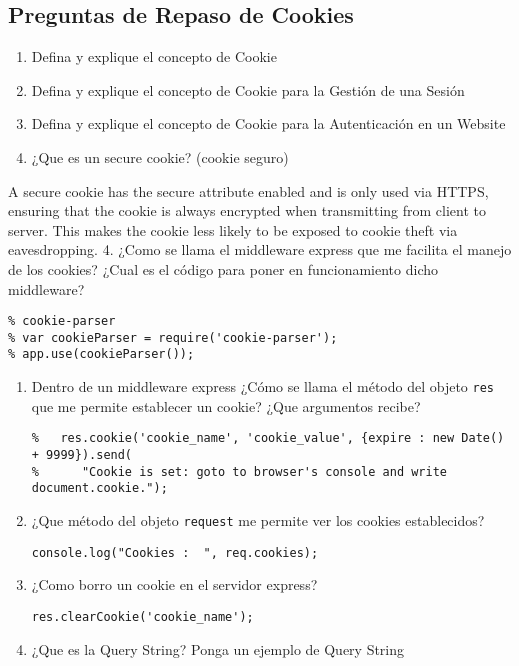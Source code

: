 \subsection{Preguntas de Repaso de
Cookies}\label{preguntas-de-repaso-de-cookies}

\begin{enumerate}
\def\labelenumi{\arabic{enumi}.}
\itemsep1pt\parskip0pt
\item
  Defina y explique el concepto de Cookie
\item
  Defina y explique el concepto de Cookie para la Gestión de una Sesión
\item
  Defina y explique el concepto de Cookie para la Autenticación en un
  Website
\item
  ¿Que es un secure cookie? (cookie seguro)
\end{enumerate}

A secure cookie has the secure attribute enabled and is only used via
HTTPS, ensuring that the cookie is always encrypted when transmitting
from client to server. This makes the cookie less likely to be exposed
to cookie theft via eavesdropping. 4. ¿Como se llama el middleware
express que me facilita el manejo de los cookies? ¿Cual es el código
para poner en funcionamiento dicho middleware?

\begin{verbatim}
% cookie-parser
% var cookieParser = require('cookie-parser');
% app.use(cookieParser());
\end{verbatim}

\begin{enumerate}
\def\labelenumi{\arabic{enumi}.}
\setcounter{enumi}{4}
\item
  Dentro de un middleware express ¿Cómo se llama el método del objeto
  \texttt{res} que me permite establecer un cookie? ¿Que argumentos
  recibe?

\begin{verbatim}
%   res.cookie('cookie_name', 'cookie_value', {expire : new Date() + 9999}).send(
%      "Cookie is set: goto to browser's console and write document.cookie.");
\end{verbatim}
\item
  ¿Que método del objeto \texttt{request} me permite ver los cookies
  establecidos?

\begin{verbatim}
console.log("Cookies :  ", req.cookies);
\end{verbatim}
\item
  ¿Como borro un cookie en el servidor express?

\begin{verbatim}
res.clearCookie('cookie_name');
\end{verbatim}
\item
  ¿Que es la Query String? Ponga un ejemplo de Query String
\end{enumerate}

